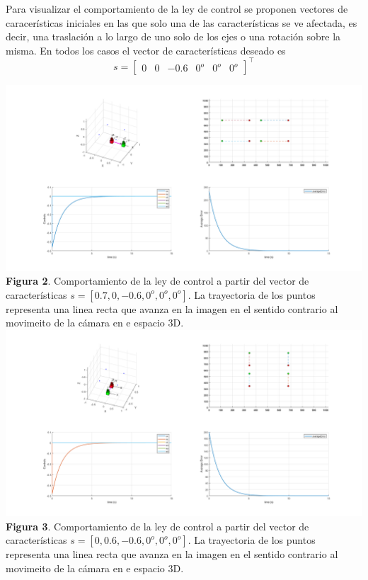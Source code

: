\documentclass{article}
\begin{document}
	Para visualizar el comportamiento de la ley de control se proponen vectores de caracer\'isticas iniciales en las que solo una de las caracter\'isticas se ve afectada, es decir, una traslaci\'on a lo largo de uno solo de los ejes o una rotaci\'on sobre la misma. En todos los casos el vector de caracter\'isticas deseado es
	$$
	s = \left[\begin{matrix}
		0 & 0 &-0.6& 0^o& 0^o &0^o
	\end{matrix}\right]^\top
	$$
	\begin{center}
		\includegraphics[scale=0.3]{extra_1.png}\\
	{\footnotesize \textbf{Figura 2}. Comportamiento de la ley de control a partir del vector de caracter\'isticas $s=[0.7,0,-0.6,0^o,0^o,0^o]$. La trayectoria de los puntos representa una linea recta que avanza en la imagen en el sentido contrario al movimeito de la c\'amara en e espacio 3D.}\\
	\includegraphics[scale=0.3]{extra_2.png}\\
	{\footnotesize \textbf{Figura 3}. Comportamiento de la ley de control a partir del vector de caracter\'isticas $s=[0,0.6,-0.6,0^o,0^o,0^o]$. La trayectoria de los puntos representa una linea recta que avanza en la imagen en el sentido contrario al movimeito de la c\'amara en e espacio 3D.}\\

\end{center}
\end{document}
